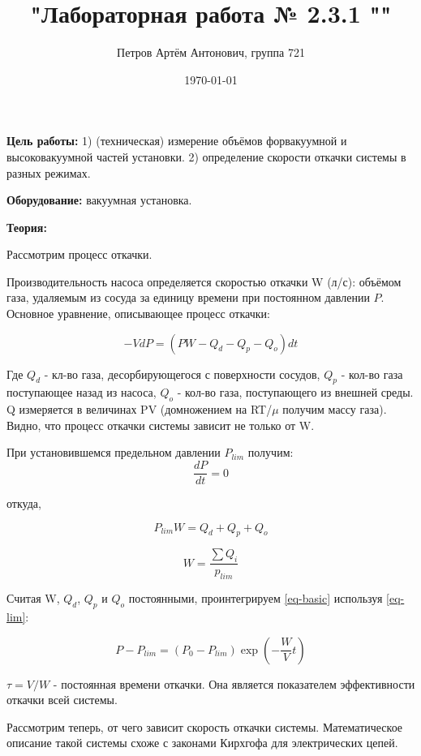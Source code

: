 \documentclass[a4paper,12pt]{article}
\author{Петров Артём Антонович, группа 721}
\title{"Лабораторная работа № 2.3.1 ""}
\date{\today}
\begin{document}

\begin{minipage}[t][5cm]{\textwidth}
\maketitle
\end{minipage}


\textbf{Цель работы:} 1) (техническая) измерение объёмов форвакуумной и высоковакуумной частей установки. 2) определение скорости откачки системы в разных режимах.
\bigskip

\textbf{Оборудование:} вакуумная установка.
\bigskip

\textbf{Теория:}
\bigskip

Рассмотрим процесс откачки.

Производительность насоса определяется скоростью откачки W (л/с): объёмом газа, удаляемым из сосуда за единицу времени при постоянном давлении $P$. Основное уравнение, описывающее процесс откачки:

\begin{equation}\label{eq-basic}
-VdP = (PW - Q_d - Q_p - Q_o)dt
\end{equation}

Где $Q_d$ - кл-во газа, десорбирующегося с поверхности сосудов, $Q_p$ - кол-во газа поступающее назад из насоса, $Q_o$ - кол-во газа, поступающего из внешней среды. Q измеряется в величинах PV (домножением на RT/$\mu$ получим массу газа). Видно, что процесс откачки системы зависит не только от W.

При установившемся предельном давлении $P_{lim}$ получим: 
\[\frac{dP}{dt} = 0\]

откуда, 

\begin{equation}\label{eq-lim}
P_{lim}W = Q_d + Q_p + Q_o
\end{equation}

\[W = \frac{\sum Q_i}{p_{lim}}\]

Считая W, $Q_d$, $Q_p$ и $Q_o$ постоянными, проинтегрируем \ref{eq-basic} используя \ref{eq-lim}:

\begin{equation}
P - P_{lim} = (P_0 - P_{lim})\exp(-\frac{W}{V}t)
\end{equation}

$\tau = V/W$ - постоянная времени откачки. Она является показателем эффективности откачки всей системы.  

Рассмотрим теперь, от чего зависит скорость откачки системы. Математическое описание такой системы схоже с законами Кирхгофа для электрических цепей. 
\end{document}
